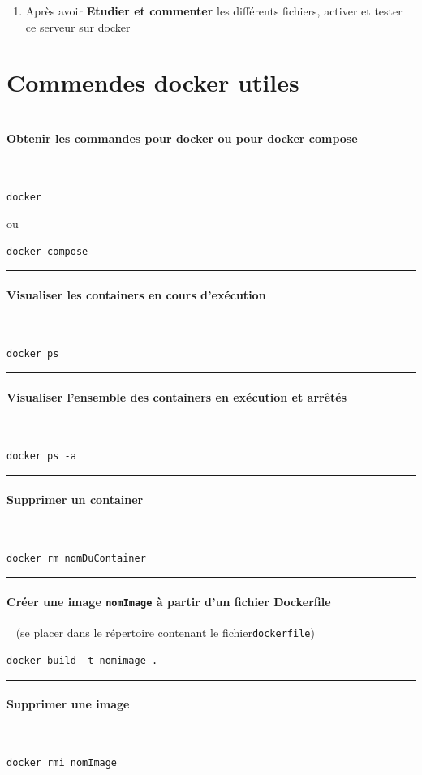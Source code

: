 \documentclass[french, 12pt]{article}%
\newcommand{\paraL}[1]{\tiny\noindent\rule{1.0\linewidth}{0.5pt}\paragraph*{#1}\  \normalsize}
\begin{document}
\begin{enumerate}
\item Après avoir \textbf{Etudier et commenter} les différents fichiers, activer et tester ce serveur sur docker 
\end{enumerate}





\appendix
\newpage
\section{Commendes docker utiles}
\label{lbl_CommandeUtiles}


\paraL{Obtenir les commandes pour docker ou pour docker compose}
\begin{lstlisting}[style=commande]
docker 
\end{lstlisting}

ou 

\begin{lstlisting}[style=commande]
docker compose 
\end{lstlisting}

\paraL{Visualiser les containers en cours d'exécution}

\begin{lstlisting}[style=commande]
docker ps
\end{lstlisting}


\paraL{Visualiser l'ensemble des containers en exécution et arrêtés}

\begin{lstlisting}[style=commande]
docker ps -a
\end{lstlisting}


\paraL{Supprimer un container}

\begin{lstlisting}[style=commande]
docker rm nomDuContainer
\end{lstlisting}

\paraL{Créer une image \verb?nomImage? à partir d'un fichier Dockerfile} (se placer dans le répertoire contenant le fichier\verb?dockerfile?)

\begin{lstlisting}[style=commande]
docker build -t nomimage .
\end{lstlisting}

\paraL{Supprimer une image}

\begin{lstlisting}[style=commande]
docker rmi nomImage
\end{lstlisting}
\end{document}
